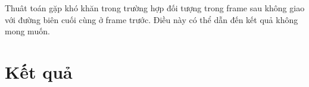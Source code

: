 \documentclass[12pt,oneside,a4]{report}
\newcommand{\De}{\Delta}
\begin{document}
Thuât toán gặp khó khăn trong trường hợp đối tượng trong frame sau không giao với đường biên cuối cùng ở frame trước. Điều này có thể dẫn đến kết quả không mong muốn.
\section{Kết quả}
\end{document}
